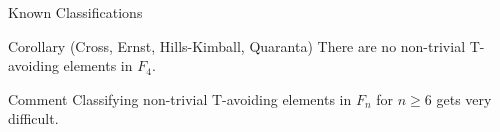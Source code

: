 \documentclass[9pt,handout]{beamer}
\newcommand\heapblock[4]{\fill[fill=#4, fill opacity=0.35, draw=#4, line width=1.1pt, rounded corners,shift={(\xxaxis:#1)},shift={(\yyaxis:#2)}] (-1,-1) rectangle (1,1);\node at (#1,#2) {\footnotesize $#3$};}
\newcommand\xxaxis{0}
\newcommand\yyaxis{90}
\begin{document}
\begin{frame}{Known Classifications}

\begin{block}{Corollary (Cross, Ernst, Hills-Kimball, Quaranta)}
There are no non-trivial T-avoiding elements in $F_4$.	
\end{block}
\pause

\begin{block}{Comment}
Classifying non-trivial T-avoiding elements in $F_n$ for $n \geq 6$ gets very difficult.	
\end{block}

\vspace{-1em}

\begin{figure}\centering
{}
\end{figure}


\end{frame}




%
%


\end{document}
